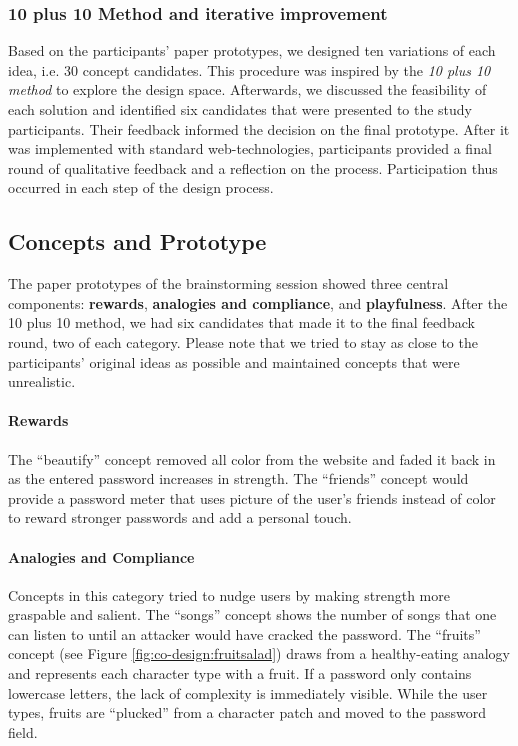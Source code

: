 \subsubsection{10 plus 10 Method and iterative improvement}
Based on the participants' paper prototypes, we designed ten variations of each idea, i.e. 30 concept candidates. This procedure was inspired by the \textit{10 plus 10 method} to explore the design space. %
Afterwards, we discussed the feasibility of each solution and identified six candidates that were presented to the study participants. Their feedback informed the decision on the final prototype. After it was implemented with standard web-technologies, participants provided a final round of qualitative feedback and a reflection on the process. Participation thus occurred in each step of the design process. 

\subsection{Concepts and Prototype}
The paper prototypes of the brainstorming session showed three central components: \textbf{rewards}, \textbf{analogies and compliance}, and \textbf{playfulness}. After the 10 plus 10 method, we had six candidates that made it to the final feedback round, two of each category. Please note that we tried to stay as close to the participants' original ideas as possible and maintained concepts that were unrealistic. 
\paragraph{Rewards} The ``beautify'' concept removed all color from the website and faded it back in as the entered password increases in strength. The ``friends'' concept would provide a password meter that uses picture of the user's friends instead of color to reward stronger passwords and add a personal touch. 
\paragraph{Analogies and Compliance}
Concepts in this category tried to nudge users by making strength more graspable and salient. The ``songs'' concept shows the number of songs that one can listen to until an attacker would have cracked the password. The ``fruits'' concept (see Figure \ref{fig:co-design:fruitsalad}) draws from a healthy-eating analogy and represents each character type with a fruit. If a password only contains lowercase letters, the lack of complexity is immediately visible. While the user types, fruits are ``plucked'' from a character patch and moved to the password field.
